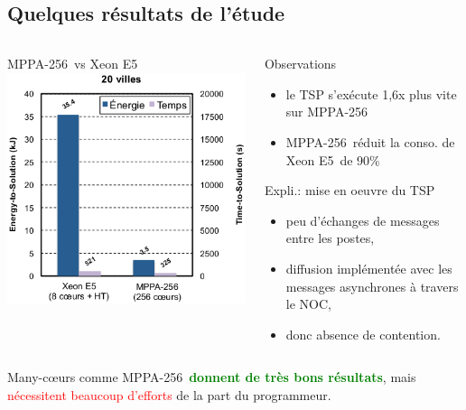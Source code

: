 \documentclass[10pt]{beamer}
\newcommand{\xeon}{{\small \textsf{Xeon E5}}\xspace}
\newcommand{\mppa}{{\small \textsf{MPPA-256}}\xspace}
\begin{document}
\subsection{Quelques résultats de l'étude}
\begin{frame}
\begin{columns}[T]
    \begin{column}{.47\textwidth}
    \begin{block}{\mppa \ vs \xeon}
	\includegraphics[scale=0.4]{figures/en_ti_solution}
    \end{block}
    \end{column}
    \begin{column}{.5\textwidth}
     \begin{block}{Observations}
      \begin{itemize}
       \item le TSP s'exécute 1,6x plus vite sur \mppa
       \item \mppa \ réduit la conso. de \xeon \ de 90\%
      \end{itemize}
     \end{block}
      \begin{block}{Expli.: mise en oeuvre du TSP}
	\begin{itemize}
	\item peu d'échanges de messages entre les postes,
	\item diffusion implémentée avec les messages asynchrones à travers le NOC,
	\item donc absence de contention.
	\end{itemize}
      \end{block}
    \end{column}
  \end{columns}
  Many-c\oe urs comme \mppa \ \textbf{\textcolor{green}{donnent de très bons résultats}}, mais \textcolor{red}{nécessitent beaucoup d'efforts} de la part du programmeur.
\end{frame}
\end{document}
